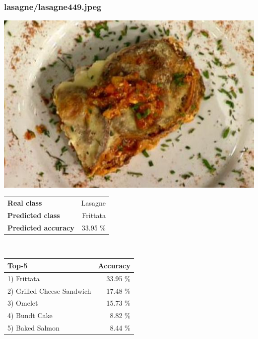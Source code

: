 \subsubsection{lasagne/lasagne449.jpeg}

\begin{minipage}[t]{0.4\textwidth}
	\vspace{0pt}
	\includegraphics[width=\linewidth]{images/evaluation-images/lasagne/lasagne449.jpeg}
\end{minipage}
\hfill
\begin{minipage}[t]{0.5\textwidth}
	\vspace{0pt}\raggedright
	\begin{tabularx}{\textwidth}{X r}
		\small \textbf{Real class} & \small Lasagne\\
		\small \textbf{Predicted class} & \small Frittata\\
		\small \textbf{Predicted accuracy} & \small 33.95 \%
    \end{tabularx}\\
    
    \vspace{6pt}
	\begin{tabularx}{\textwidth}{X r}
        \small \textbf{Top-5} & \small \textbf{Accuracy} \\
        \hline
		\small 1) Frittata & \small 33.95 \%\\\small 2) Grilled Cheese Sandwich & \small 17.48 \%\\\small 3) Omelet & \small 15.73 \%\\\small 4) Bundt Cake & \small 8.82 \%\\\small 5) Baked Salmon & \small 8.44 \%
    \end{tabularx}
\end{minipage}
    

